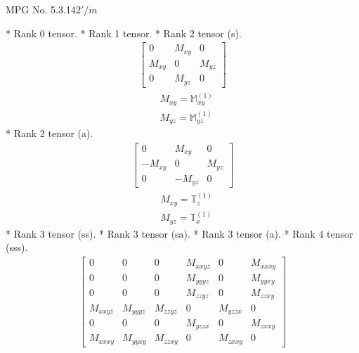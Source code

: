 \documentclass[fleqn,8pt,landscape]{jsarticle}
\begin{document}
\setcounter{MaxMatrixCols}{32}

\renewcommand{\tablename}{Table~}
\renewcommand{\figurename}{Figure~}
\begin{center}
\LARGE
MPG No. 5.3.14\quad$2'/m$
\end{center}
* Rank 0 tensor.
* Rank 1 tensor.
* Rank 2 tensor (s).
\begin{align*}
\begin{bmatrix} 0 & M_{xy} & 0 \\ M_{xy} & 0 & M_{yz} \\ 0 & M_{yz} & 0 \end{bmatrix}
\end{align*}
\begin{align*}
& M_{xy} = \mathbb{M}_{xy}^{(1)} \\
& M_{yz} = \mathbb{M}_{yz}^{(1)}
\end{align*}
* Rank 2 tensor (a).
\begin{align*}
\begin{bmatrix} 0 & M_{xy} & 0 \\ - M_{xy} & 0 & M_{yz} \\ 0 & - M_{yz} & 0 \end{bmatrix}
\end{align*}
\begin{align*}
& M_{xy} = \mathbb{T}_{z}^{(1)} \\
& M_{yz} = \mathbb{T}_{x}^{(1)}
\end{align*}
* Rank 3 tensor (ss).
* Rank 3 tensor (sa).
* Rank 3 tensor (a).
* Rank 4 tensor (sss).
\begin{align*}
\begin{bmatrix} 0 & 0 & 0 & M_{xxyz} & 0 & M_{xxxy} \\ 0 & 0 & 0 & M_{yyyz} & 0 & M_{yyxy} \\ 0 & 0 & 0 & M_{zzyz} & 0 & M_{zzxy} \\ M_{xxyz} & M_{yyyz} & M_{zzyz} & 0 & M_{yzzx} & 0 \\ 0 & 0 & 0 & M_{yzzx} & 0 & M_{zxxy} \\ M_{xxxy} & M_{yyxy} & M_{zzxy} & 0 & M_{zxxy} & 0 \end{bmatrix}
\end{align*}
\end{document}
